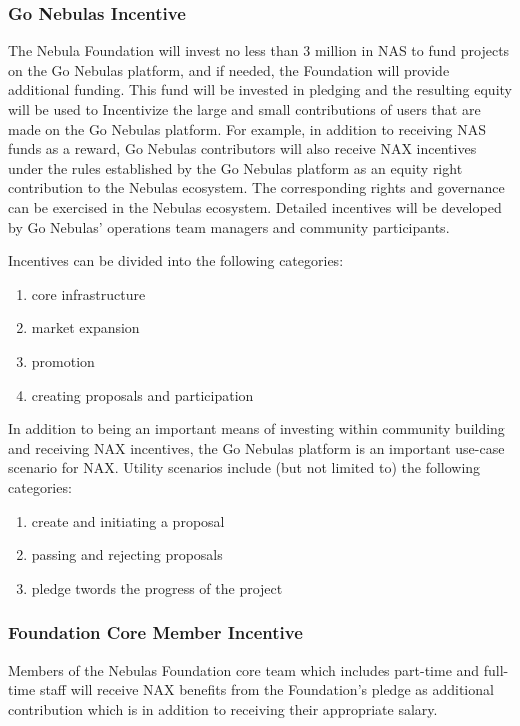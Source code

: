 \subsubsection{Go Nebulas Incentive}
The Nebula Foundation will invest no less than $3$ million in NAS to fund projects on the Go Nebulas platform, and if needed, the Foundation will provide additional funding. This fund will be invested in pledging and the resulting equity will be used to Incentivize the large and small contributions of users that are made on the Go Nebulas platform. For example, in addition to receiving NAS funds as a reward, Go Nebulas contributors will also receive NAX incentives under the rules established by the Go Nebulas platform as an equity right contribution to the Nebulas ecosystem. The corresponding rights and governance can be exercised in the Nebulas ecosystem. Detailed incentives will be developed by Go Nebulas' operations team managers and community participants.

Incentives can be divided into the following categories:
\begin{enumerate}[\hspace{1cm}(a)]
	\item core infrastructure
	\item market expansion
	\item promotion
	\item creating proposals and participation
\end{enumerate}

In addition to being an important means of investing within community building and receiving NAX incentives, the Go Nebulas platform is an important use-case scenario for NAX. Utility scenarios include (but not limited to) the following categories:
\begin{enumerate}[\hspace{1cm}(a)]
	\item create and initiating a proposal
	\item passing and rejecting proposals
	\item pledge twords the progress of the project
\end{enumerate}

\subsubsection{Foundation Core Member Incentive}
Members of the Nebulas Foundation core team which includes part-time and full-time staff will receive NAX benefits from the Foundation's pledge as additional contribution which is in addition to receiving their appropriate salary.

